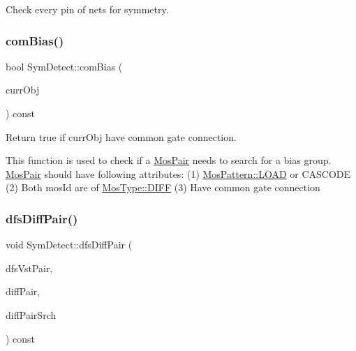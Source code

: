 Check every pin of nets for symmetry. 

\mbox{\label{classSymDetect_a13ddc56c5e937097178352eb00d71cf3}} 
\subsubsection{\texorpdfstring{com\+Bias()}{comBias()}}
{\footnotesize\ttfamily bool Sym\+Detect\+::com\+Bias (\begin{DoxyParamCaption}\item[{\hyperlink{classMosPair}{Mos\+Pair} \&}]{curr\+Obj }\end{DoxyParamCaption}) const\hspace{0.3cm}{\ttfamily [private]}}



Return true if curr\+Obj have common gate connection. 

This function is used to check if a \hyperlink{classMosPair}{Mos\+Pair} needs to search for a bias group. \hyperlink{classMosPair}{Mos\+Pair} should have following attributes\+: (1) \hyperlink{type_8h_af19eddb079bfea723256710b029c38e8a615d2885ef7576cedd9aafbb2578f028}{Mos\+Pattern\+::\+L\+O\+AD} or C\+A\+S\+C\+O\+DE (2) Both mos\+Id are of \hyperlink{type_8h_a34a6a66323cfecf83dfe00bc8fd96333aa2e1ec2dd3d8195d238c5494f0ac5578}{Mos\+Type\+::\+D\+I\+FF} (3) Have common gate connection \mbox{\label{classSymDetect_acd33a2c834493240fc4e8840819d676c}} 
\subsubsection{\texorpdfstring{dfs\+Diff\+Pair()}{dfsDiffPair()}}
{\footnotesize\ttfamily void Sym\+Detect\+::dfs\+Diff\+Pair (\begin{DoxyParamCaption}\item[{std\+::vector$<$ \hyperlink{classMosPair}{Mos\+Pair} $>$ \&}]{dfs\+Vst\+Pair,  }\item[{\hyperlink{classMosPair}{Mos\+Pair} \&}]{diff\+Pair,  }\item[{std\+::vector$<$ \hyperlink{classMosPair}{Mos\+Pair} $>$ \&}]{diff\+Pair\+Srch }\end{DoxyParamCaption}) const\hspace{0.3cm}{\ttfamily [private]}}



